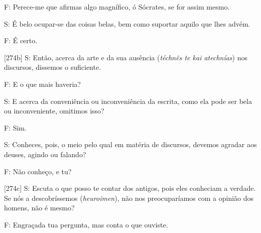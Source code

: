 F: Perece-me que afirmas algo magnífico, ó Sócrates, se for assim mesmo.

S: É belo ocupar-se das coisas belas, bem como suportar aquilo que lhes
advém.

F: É certo.

{[}274b{]} S: Então, acerca da arte e da sua ausência (\emph{téchnês te
kai atechnías}) nos discursos, dissemos o suficiente.

F: E o que mais haveria?

S: E acerca da conveniência ou inconveniência da escrita, como ela pode
ser bela ou inconveniente, omitimos isso?

F: Sim.

S: Conheces, pois, o meio pelo qual em matéria de discursos, devemos
agradar aos deuses, agindo ou falando?

F: Não conheço, e tu?

{[}274c{]} S: Escuta o que posso te contar dos antigos, pois eles
conheciam a verdade. Se nós a descobríssemos (\emph{heuroimen}), não nos
preocuparíamos com a opinião dos homens, não é mesmo?

F: Engraçada tua pergunta, mas conta o que ouviste.

